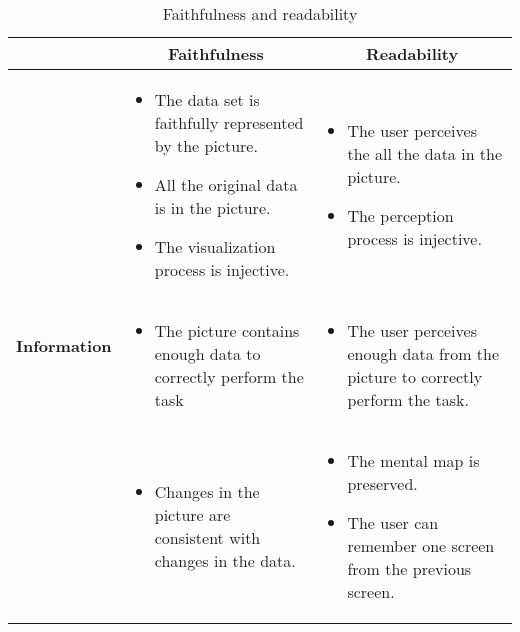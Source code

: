 \documentclass[10pt,journal,cspaper,compsoc]{IEEEtran}
\begin{document}
\begin{table*}
\centering\small\addtolength{\tabcolsep}{0pt}
\caption{Faithfulness and readability}\label{table:vizFaithSummary}
\begin{tabular}{| p{}| p{}| p{}|}
\hline 
 & \multicolumn{1}{c|}{\bf Faithfulness} & \multicolumn{1}{c|}{\bf Readability} \\[.1cm]\hline
\multirow{4}{*}{\bf Information} 
 & 
 \begin{itemize}
    \item The data set is faithfully represented by the picture. 
    \item All the original data is in the picture.
    \item The visualization process is injective.
    \end{itemize} 
 &  \begin{itemize}
    \item The user perceives the all the data in the picture.
 	\item The perception process is injective.
    \end{itemize}
\\[-.2cm]\hline 
\multirow{2}{*}{\bf Task} 
 &  \begin{itemize}
    \item The picture contains enough data to correctly perform the task
    \end{itemize} 
 & \begin{itemize}
    \item The user perceives enough data from the picture to correctly perform the task.
    \end{itemize} 
\\[-.2cm]\hline
\multirow{3}{*}{\bf Change} 
 &  \begin{itemize}
    \item Changes in the picture are consistent with changes in the data.
    \end{itemize} 
 & \begin{itemize}
    \item The mental map is preserved.
    \item The user can remember one screen from the previous screen.
    \end{itemize} 
\\ \hline
\end{tabular}
\end{table*}
\end{document}
